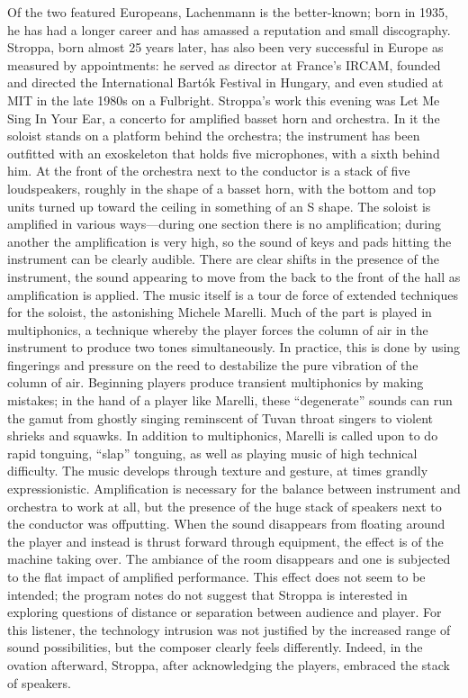 Of the two featured Europeans, Lachenmann is the better-known; born in 1935, he has had a longer career and has amassed a reputation and small discography. Stroppa, born almost 25 years later, has also been very successful in Europe as measured by appointments: he served as director at France’s IRCAM, founded and directed the International Bartók Festival in Hungary, and even studied at MIT in the late 1980s on a Fulbright. Stroppa’s work this evening was Let Me Sing In Your Ear, a concerto for amplified basset horn and orchestra. In it the soloist stands on a platform behind the orchestra; the instrument has been outfitted with an exoskeleton that holds five microphones, with a sixth behind him. At the front of the orchestra next to the conductor is a stack of five loudspeakers, roughly in the shape of a basset horn, with the bottom and top units turned up toward the ceiling in something of an S shape. The soloist is amplified in various ways—during one section there is no amplification; during another the amplification is very high, so the sound of keys and pads hitting the instrument can be clearly audible. There are clear shifts in the presence of the instrument, the sound appearing to move from the back to the front of the hall as amplification is applied. The music itself is a tour de force of extended techniques for the soloist, the astonishing Michele Marelli. Much of the part is played in multiphonics, a technique whereby the player forces the column of air in the instrument to produce two tones simultaneously. In practice, this is done by using fingerings and pressure on the reed to destabilize the pure vibration of the column of air. Beginning players produce transient multiphonics by making mistakes; in the hand of a player like Marelli, these “degenerate” sounds can run the gamut from ghostly singing reminscent of Tuvan throat singers to violent shrieks and squawks. In addition to multiphonics, Marelli is called upon to do rapid tonguing, “slap” tonguing, as well as playing music of high technical difficulty. The music develops through texture and gesture, at times grandly expressionistic. Amplification is necessary for the balance between instrument and orchestra to work at all, but the presence of the huge stack of speakers next to the conductor was offputting. When the sound disappears from floating around the player and instead is thrust forward through equipment, the effect is of the machine taking over. The ambiance of the room disappears and one is subjected to the flat impact of amplified performance. This effect does not seem to be intended; the program notes do not suggest that Stroppa is interested in exploring questions of distance or separation between audience and player. For this listener, the technology intrusion was not justified by the increased range of sound possibilities, but the composer clearly feels differently. Indeed, in the ovation afterward, Stroppa, after acknowledging the players, embraced the stack of speakers.

